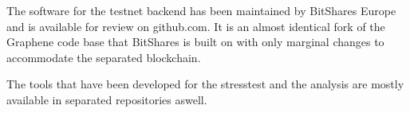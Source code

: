 The software for the testnet backend has been maintained by BitShares Europe and is
available for review on github.com. It is an almost identical fork of the
Graphene code base that BitShares is built on with only marginal changes to
accommodate the separated blockchain.

The tools that have been developed for the stresstest and the analysis are
mostly available in separated repositories aswell.
